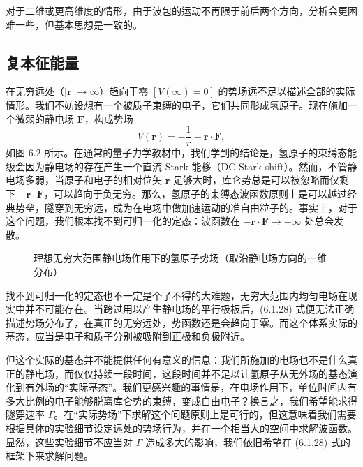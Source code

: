 对于二维或更高维度的情形，由于波包的运动不再限于前后两个方向，分析会更困难一些，但基本思想是一致的。

\subsection{复本征能量}

在无穷远处（$|\bm r|\to\infty$）趋向于零 $[V(\infty)=0]$ 的势场远不足以描述全部的实际情形。我们不妨设想有一个被质子束缚的电子，它们共同形成氢原子。现在施加一个微弱的静电场 $\bm F$，构成势场
\begin{equation}
 V(\bm r)=-\frac1r-\bm r\cdot\bm F,
\tag{6.1.28}
\end{equation}
如图 6.2 所示。在通常的量子力学教材中，我们学到的结论是，氢原子的束缚态能级会因为静电场的存在产生一个直流 Stark 能移（DC Stark shift）。然而，不管静电场多弱，当原子和电子的相对位矢 $\bm r$ 足够大时，库仑势总是可以被忽略而仅剩下 $-\bm r\cdot\bm F$，可以趋向于负无穷。那么，氢原子的束缚态波函数原则上是可以越过经典势垒，隧穿到无穷远，成为在电场中做加速运动的准自由粒子的。事实上，对于这个问题，我们根本找不到可归一化的定态：波函数在 $-\bm r\cdot\bm F\to-\infty$ 处总会发散。

\begin{figure}[htbp]
\centering
{}
\caption{理想无穷大范围静电场作用下的氢原子势场（取沿静电场方向的一维分布）}
\label{fig:6-2}
\end{figure}

找不到可归一化的定态也不一定是个了不得的大难题，无穷大范围内均匀电场在现实中并不可能存在。当跨过用以产生静电场的平行极板后，(6.1.28) 式便无法正确描述势场分布了，在真正的无穷远处，势函数还是会趋向于零。而这个体系实际的基态，应当是电子和质子分别被吸附到正极和负极附近。

但这个实际的基态并不能提供任何有意义的信息：我们所施加的电场也不是什么真正的静电场，而仅仅持续一段时间，这段时间并不足以让氢原子从无外场的基态演化到有外场的“实际基态”。我们更感兴趣的事情是，在电场作用下，单位时间内有多大比例的电子能够脱离库仑势的束缚，变成自由电子？换言之，我们希望能求得隧穿速率 $\Gamma$。在“实际势场”下求解这个问题原则上是可行的，但这意味着我们需要根据具体的实验细节设定远处的势场行为，并在一个相当大的空间中求解波函数。显然，这些实验细节不应当对 $\Gamma$ 造成多大的影响，我们依旧希望在 (6.1.28) 式的框架下来求解问题。


